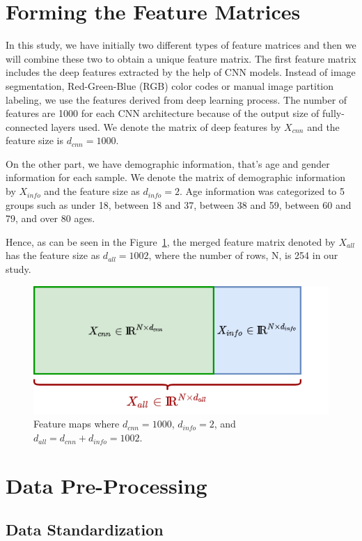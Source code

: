 \section{Forming the Feature Matrices} \label{sec:CH5_forming_features}

In this study, we have initially two different types of feature matrices and then we will combine these two to obtain a unique feature matrix. The first feature matrix includes the deep features extracted by the help of CNN models. Instead of image segmentation, Red-Green-Blue (RGB) color codes or manual image partition labeling, we use the features derived from deep learning process. The number of features are 1000 for each CNN architecture because of the output size of fully-connected layers used. We denote the matrix of deep features by $X_{cnn}$ and the feature size is $d_{cnn} = 1000$.

On the other part, we have demographic information, that's age and gender information for each sample. We denote the matrix of demographic information by $X_{info}$ and the feature size as $d_{info} = 2$. Age information was categorized to 5 groups such as under 18, between 18 and 37, between 38 and 59, between 60 and 79, and over 80 ages.

Hence, as can be seen in the Figure~\ref{fig:feature_maps}, the merged feature matrix denoted by $X_{all}$ has the feature size as $d_{all} = 1002$, where the number of rows, N, is 254 in our study.

\begin{figure}[h]
    \centering
    \includegraphics[width=.6\linewidth]{fig/feature_maps.png}
    \vspace{2mm}
    \caption{Feature maps where $d_{cnn} = 1000$, $d_{info} = 2$, and $d_{all} = d_{cnn} + d_{info} = 1002$.}
    \label{fig:feature_maps}
\end{figure}

\section{Data Pre-Processing}

\subsection{Data Standardization}

